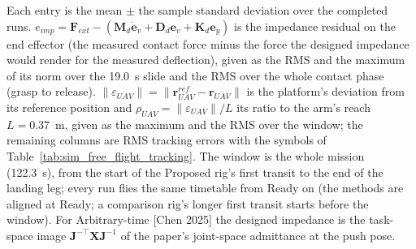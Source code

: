 \begin{table}[H]
\begin{threeparttable}
\begin{tabular}{l c c c c c c c c c c c c c c c c c c c c c c}
\bottomrule
\end{tabular}
\begin{tablenotes}
\footnotesize
\item[] Each entry is the mean $\pm$ the sample standard deviation over the completed runs. $e_{imp} = \boldsymbol{F}_{ext} - (\boldsymbol{M}_d \dot{\boldsymbol{e}}_v + \boldsymbol{D}_d \boldsymbol{e}_v + \boldsymbol{K}_d \boldsymbol{e}_y)$ is the impedance residual on the end effector (the measured contact force minus the force the designed impedance would render for the measured deflection), given as the RMS and the maximum of its norm over the 19.0~s slide and the RMS over the whole contact phase (grasp to release). $\|\varepsilon_{UAV}\| = \|\boldsymbol{r}_{UAV}^{ref} - \boldsymbol{r}_{UAV}\|$ is the platform's deviation from its reference position and $\rho_{UAV} = \|\varepsilon_{UAV}\|/L$ its ratio to the arm's reach $L = 0.37$~m, given as the maximum and the RMS over the window; the remaining columns are RMS tracking errors with the symbols of Table~\ref{tab:sim_free_flight_tracking}. The window is the whole mission (122.3~s), from the start of the Proposed rig's first transit to the end of the landing leg; every run flies the same timetable from Ready on (the methods are aligned at Ready; a comparison rig's longer first transit starts before the window). For Arbitrary-time [Chen 2025] the designed impedance is the task-space image $\boldsymbol{J}^{-\top}\boldsymbol{X}\boldsymbol{J}^{-1}$ of the paper's joint-space admittance at the push pose.
\end{tablenotes}
\end{threeparttable}
\end{table}
